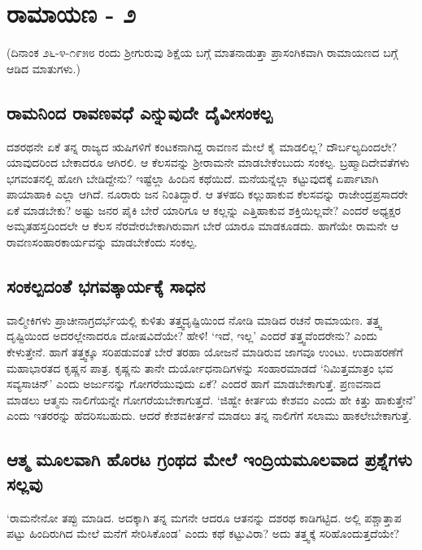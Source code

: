 \chapter{ರಾಮಾಯಣ - ೨}

(ದಿನಾಂಕ ೨೬-೪-೧೯೫೮ ರಂದು ಶ್ರೀಗುರುವು ಶಿಕ್ಷೆಯ ಬಗ್ಗೆ ಮಾತನಾಡುತ್ತಾ ಪ್ರಾಸಂಗಿಕವಾಗಿ ರಾಮಾಯಣದ ಬಗ್ಗೆ ಆಡಿದ ಮಾತುಗಳು.)

\section*{ರಾಮನಿಂದ ರಾವಣವಧೆ ಎನ್ನುವುದೇ ದೈವೀಸಂಕಲ್ಪ}

ದಶರಥನೇ ಏಕೆ ತನ್ನ ರಾಜ್ಯದ ಋಷಿಗಳಿಗೆ ಕಂಟಕನಾಗಿದ್ದ ರಾವಣನ ಮೇಲೆ ಕೈ ಮಾಡಲಿಲ್ಲ? ದೌರ್ಬಲ್ಯದಿಂದಲೇ? ಯಾವುದರಿಂದ ಬೇಕಾದರೂ ಆಗಿರಲಿ. ಆ ಕೆಲಸವನ್ನು  ಶ್ರೀರಾಮನೇ ಮಾಡಬೇಕೆಂಬುದು ಸಂಕಲ್ಪ. ಬ್ರಹ್ಮಾದಿದೇವತೆಗಳು ಭಗವಂತನಲ್ಲಿ ಹೋಗಿ ಬೇಡಿದ್ದೇನು? ಇಷ್ಟೆಲ್ಲಾ ಹಿಂದಿನ ಕಥೆಯಿದೆ. ಮನೆಯನ್ನೆಲ್ಲಾ ಕಟ್ಟುವುದಕ್ಕೆ ಏರ್ಪಾಟಾಗಿ ಪಾಯಾಹಾಕಿ ಎಲ್ಲಾ ಆಗಿದೆ. ನೂರಾರು ಜನ ನಿಂತಿದ್ದಾರೆ. ಆ ತಳಹದಿ ಕಲ್ಲುಹಾಕುವ ಕೆಲಸವನ್ನು ರಾಜೇಂದ್ರಪ್ರಸಾದರೇ ಏಕೆ ಮಾಡಬೇಕು? ಅಷ್ಟು ಜನರ ಪೈಕಿ ಬೇರೆ ಯಾರಿಗೂ ಆ ಕಲ್ಲನ್ನು ಎತ್ತಿಹಾಕುವ ಶಕ್ತಿಯಿಲ್ಲವೇ? ಎಂದರೆ ಅಧ್ಯಕ್ಷರ ಅಮೃತಹಸ್ತದಿಂದಲೇ ಆ ಕೆಲಸ ನೆರವೇರಬೇಕಾಗಿರುವಾಗ ಬೇರೆ ಯಾರೂ ಮಾಡಕೂಡದು. ಹಾಗೆಯೇ ರಾಮನೇ ಆ ರಾವಣಸಂಹಾರಕಾರ್ಯವನ್ನು ಮಾಡಬೇಕೆಂದು ಸಂಕಲ್ಪ.

\section*{ಸಂಕಲ್ಪದಂತೆ ಭಗವತ್ಕಾರ್ಯಕ್ಕೆ ಸಾಧನ}

ವಾಲ್ಮೀಕಿಗಳು ಪ್ರಾಚೀನಾಗ್ರದರ್ಭೆಯಲ್ಲಿ ಕುಳಿತು ತತ್ತ್ವದೃಷ್ಟಿಯಿಂದ ನೋಡಿ ಮಾಡಿದ ರಚನೆ ರಾಮಾಯಣ. ತತ್ತ್ವ ದೃಷ್ಟಿಯಿಂದ ಅದರಲ್ಲೇನಾದರೂ ದೋಷವಿದೆಯೇ? ಹೇಳಿ! `ಇದೆ, ಇಲ್ಲ' ಎಂದರೆ ತತ್ತ್ವವೆಂದರೇನು? ಎಂದು ಕೇಳುತ್ತೇನೆ. ಹಾಗೆ ತತ್ತ್ವಕ್ಕೂ ಸರಿಪಡುವಂತೆ ಬೇರೆ ತರಹಾ ಯೋಜನೆ ಮಾಡಿರುವ ಜಾಗವೂ ಉಂಟು. ಉದಾಹರಣೆಗೆ ಮಹಾಭಾರತದ ಕೃಷ್ಣನ ಪಾತ್ರ. ಕೃಷ್ಣನು ತಾನೇ ದುರ್ಯೋಧನಾದಿಗಳನ್ನು ಸಂಹಾರಮಾಡದೆ `ನಿಮಿತ್ತಮಾತ್ರಂ ಭವ ಸವ್ಯಸಾಚಿನ್\label{214a}' ಎಂದು ಅರ್ಜುನನ್ನು ಗೋಗರೆಯುವುದು ಏಕೆ? ಎಂದರೆ ಹಾಗೆ ಮಾಡಬೇಕಾಗುತ್ತೆ. ಪ್ರಣವನಾದ ಮಾಡಲು ಆತ್ಮನು ನಾಲಿಗೆಯನ್ನೇ ಗೋಗರೆಯಬೇಕಾಗುತ್ತದೆ. `ಜಿಹ್ವೇ ಕೀರ್ತಯ ಕೇಶವಂ\label{214} ಎಂದು ಹೇ ಕಿತ್ತು ಹಾಕುತ್ತೇನೆ' ಎಂದು ಇತರರನ್ನು ಹೆದರಿಸಬಹುದು. ಆದರೆ ಕೇಶವಕೀರ್ತನೆ ಮಾಡಲು ತನ್ನ ನಾಲಿಗೆಗೆ ಸಲಾಮು ಹಾಕಲೇಬೇಕಾಗುತ್ತೆ. 

\section*{ಆತ್ಮ ಮೂಲವಾಗಿ ಹೊರಟ ಗ್ರಂಥದ ಮೇಲೆ ಇಂದ್ರಿಯಮೂಲವಾದ ಪ್ರಶ್ನೆಗಳು ಸಲ್ಲವು}

`ರಾಮನೇನೋ ತಪ್ಪು ಮಾಡಿದ. ಅದಕ್ಕಾಗಿ ತನ್ನ ಮಗನೇ ಆದರೂ ಆತನನ್ನು ದಶರಥ ಕಾಡಿಗಟ್ಟಿದ. ಅಲ್ಲಿ ಪಶ್ಚಾತ್ತಾಪ ಪಟ್ಟು ಹಿಂದಿರುಗಿದ ಮೇಲೆ ಮನೆಗೆ ಸೇರಿಸಿಕೊಂಡ' ಎಂದು ಕಥೆ ಕಟ್ಟುವಿರಾ? ಅದು ತತ್ತ್ವಕ್ಕೆ ಸರಿಹೊಂದುತ್ತದೆಯೇ?

